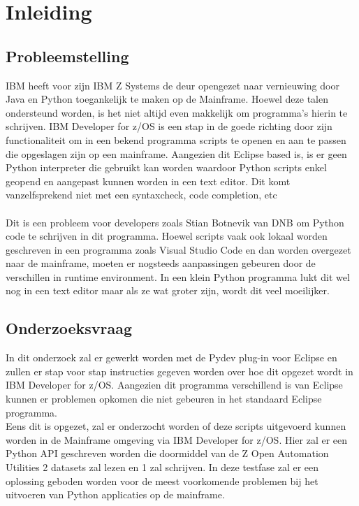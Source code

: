 
\chapter{Inleiding}%
\label{ch:inleiding}

\section{Probleemstelling}%
\label{sec:probleemstelling}
IBM heeft voor zijn IBM Z Systems de deur opengezet naar vernieuwing door Java en Python toegankelijk te maken op de Mainframe. Hoewel deze talen ondersteund worden, is het niet altijd even makkelijk om programma's hierin te schrijven. IBM Developer for z/OS is een stap in de goede richting door zijn functionaliteit om in een bekend programma scripts te openen en aan te passen die opgeslagen zijn op een mainframe. Aangezien dit Eclipse based is, is er geen Python interpreter die gebruikt kan worden waardoor Python scripts enkel geopend en aangepast kunnen worden in een text editor. Dit komt vanzelfsprekend niet met een syntaxcheck, code completion, etc \\ \\
Dit is een probleem voor developers zoals Stian Botnevik van DNB om Python code te schrijven in dit programma. Hoewel scripts vaak ook  lokaal worden geschreven in een programma zoals Visual Studio Code en dan worden overgezet naar de mainframe, moeten er nogsteeds aanpassingen gebeuren door de verschillen in runtime environment. In een klein Python programma lukt dit wel nog in een text editor maar als ze wat groter zijn, wordt dit veel moeilijker.


\section{Onderzoeksvraag}%
\label{sec:onderzoeksvraag}
In dit onderzoek zal er gewerkt worden met de Pydev plug-in voor Eclipse en zullen er stap voor stap instructies gegeven worden over hoe dit opgezet wordt in IBM Developer for z/OS. Aangezien dit programma verschillend is van Eclipse kunnen er problemen opkomen die niet gebeuren in het standaard Eclipse programma. \\

Eens dit is opgezet, zal er onderzocht worden of deze scripts uitgevoerd kunnen worden  in de Mainframe omgeving via IBM Developer for z/OS. Hier zal er een Python API geschreven worden die doormiddel van de Z Open Automation Utilities 2 datasets zal lezen en 1 zal schrijven. In deze testfase zal er een oplossing geboden worden voor de meest voorkomende problemen bij het uitvoeren van Python applicaties op de mainframe.


